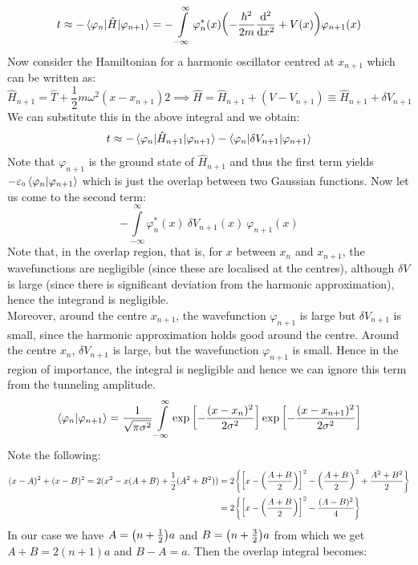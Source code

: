 \documentclass[usenames, svgnames, dvipsnames]{scrartcl}
\newcommand{\tund}[1]{_{\text{\tiny #1}}}
\begin{document}
\begin{align*}
    t \approx - \braket{\varphi_n|\hat{H}|\varphi_{n+1}} = -\int\limits_{-\infty}^\infty \varphi_{n}^*(x) \qty(-\frac{\hbar^2}{2m}\dv[2]{x}+V(x))\varphi_{n+1}(x)
\end{align*}
Now consider the Hamiltonian for a harmonic oscillator centred at $x_{n+1}$ which can be written as:
$$\hat{H}_{n+1} = \hat{T}+ \frac{1}{2}m\omega^2 (x-x_{n+1})2 \implies \hat{H} = \hat{H}_{n+1}+(V - V_{n+1}) \equiv \hat{H}_{n+1}+\delta V_{n+1}$$
We can substitute this in the above integral and we obtain:
$$t\approx - \braket{\varphi_n|\hat{H}_{n+1}|\varphi_{n+1}} - \braket{\varphi_n|\delta V_{n+1}|\varphi_{n+1}} $$
Note that $\varphi_{n+1}$ is the ground state of $\hat{H}_{n+1}$ and thus the first term yields $-\varepsilon\tund{0} \braket{\varphi_n|\varphi_{n+1}}$ which is just the overlap between two Gaussian functions. Now let us come to the second term: 
 $$-\int\limits_{-\infty}^\infty \varphi_{n}^*(x) \ \delta V_{n+1}(x)\ \varphi_{n+1}(x)$$
 Note that, in the overlap region, that is, for $x$ between $x_{n}$ and $x_{n+1}$, the wavefunctions are negligible (since these are localised at the centres), although $\delta V$ is large (since there is significant deviation from the harmonic approximation), hence the integrand is negligible.\\[0.2cm] Moreover, around the centre $x_{n+1}$, the wavefunction $\varphi_{n+1}$ is large but $\delta V_{n+1}$ is small, since the harmonic approximation holds good around the centre. Around the centre $x_n$, $\delta V_{n+1}$ is large, but the wavefunction $\varphi_{n+1}$ is small. Hence in the region of importance, the integral is negligible and hence we can ignore this term from the tunneling amplitude.
 \begin{align*}
    \braket{\varphi_n|\varphi_{n+1}} = \frac{1}{\sqrt{\pi \sigma^2}}\int\limits_{-\infty}^{\infty} \exp\qty[-\frac{(x-x_n)^2}{2\sigma^2}]\exp\qty[-\frac{(x-x_{n+1})^2}{2\sigma^2}]
 \end{align*}
 Note the following: 
 \begin{align*}
    (x-A)^2+(x-B)^2 = 2(x^2 - x(A+B) +\frac{1}{2}(A^2+B^2)) &= 2\qty{\qty[x-\qty(\frac{A+B}{2})]^2 - \qty(\frac{A+B}{2})^2 + \frac{A^2+B^2}{2}}\\
   &= 2\qty{\qty[x-\qty(\frac{A+B}{2})]^2 -\frac{(A-B)^2}{4}}
 \end{align*}
 In our case we have $A=\qty(n+\frac{1}{2})a$ and $B=\qty(n+\frac{3}{2})a$ from which we get $A+B = 2(n+1)a$ and $B-A = a$. Then the overlap integral becomes:
\end{document}
